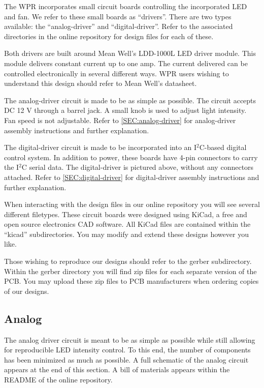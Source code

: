 \documentclass[11pt]{article}
\begin{document}
The WPR incorporates small circuit boards controlling the incorporated LED and fan.
We refer to these small boards as ``drivers''.
There are two types available: the ``analog-driver'' and ``digital-driver''.
Refer to the associated directories in the online repository for design files for each of these.

Both drivers are built around Mean Well's LDD-1000L LED driver module.
This module delivers constant current up to one amp.
The current delivered can be controlled electronically in several different ways.
WPR users wishing to understand this design should refer to Mean Well's datasheet.

The analog-driver circuit is made to be as simple as possible.
The circuit accepts DC 12 V through a barrel jack.
A small knob is used to adjust light intensity.
Fan speed is not adjustable.
Refer to \autoref{SEC:analog-driver} for analog-driver assembly instructions and further explanation.

The digital-driver circuit is made to be incorporated into an I$^2$C-based digital control system.
In addition to power, these boards have 4-pin connectors to carry the I$^2$C serial data.
The digital-driver is pictured above, without any connectors attached.
Refer to \autoref{SEC:digital-driver} for digital-driver assembly instructions and further explanation.

When interacting with the design files in our online repository you will see several different filetypes.
These circuit boards were designed using KiCad, a free and open source electronics CAD software.
All KiCad files are contained within the ``kicad'' subdirectories.
You may modify and extend these designs however you like.

Those wishing to reproduce our designs should refer to the gerber subdirectory.
Within the gerber directory you will find zip files for each separate version of the PCB.
You may upload these zip files to PCB manufacturers when ordering copies of our designs.

\clearpage
\subsection{Analog} \label{SEC:analog-driver}

The analog driver circuit is meant to be as simple as possible while still allowing for reproducible LED intensity control.
To this end, the number of components has been minimized as much as possible.
A full schematic of the analog circuit appears at the end of this section.
A bill of materials appears within the README of the online repository.
\end{document}
